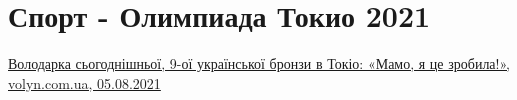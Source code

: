  
 
 
 
 
\chapter{Спорт - Олимпиада Токио 2021}


\href{https://www.volyn.com.ua/news/189579-volodarka-sohodnishnoi-9-oi-ukrainskoi-bronzy-v-tokio-mamo-ia-tse-zrobyla}{%
Володарка сьогоднішньої, 9-ої української бронзи в Токіо: «Мамо, я це зробила!», volyn.com.ua, 05.08.2021%
}

